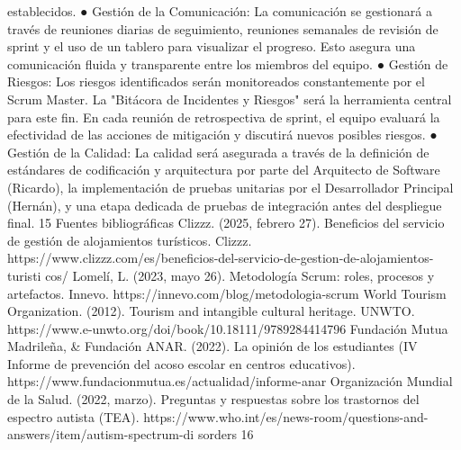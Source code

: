 establecidos.
● Gestión de la Comunicación: La comunicación se gestionará a través de
reuniones diarias de seguimiento, reuniones semanales de revisión de
sprint y el uso de un tablero para visualizar el progreso. Esto asegura una
comunicación fluida y transparente entre los miembros del equipo.
● Gestión de Riesgos: Los riesgos identificados serán monitoreados
constantemente por el Scrum Master. La "Bitácora de Incidentes y Riesgos"
será la herramienta central para este fin. En cada reunión de retrospectiva
de sprint, el equipo evaluará la efectividad de las acciones de mitigación y
discutirá nuevos posibles riesgos.
● Gestión de la Calidad: La calidad será asegurada a través de la definición
de estándares de codificación y arquitectura por parte del Arquitecto de
Software (Ricardo), la implementación de pruebas unitarias por el
Desarrollador Principal (Hernán), y una etapa dedicada de pruebas de
integración antes del despliegue final.
15
Fuentes bibliográficas
Clizzz. (2025, febrero 27). Beneficios del servicio de gestión de alojamientos
turísticos. Clizzz.
https://www.clizzz.com/es/beneficios-del-servicio-de-gestion-de-alojamientos-turisti
cos/
Lomelí, L. (2023, mayo 26). Metodología Scrum: roles, procesos y artefactos.
Innevo. https://innevo.com/blog/metodologia-scrum
World Tourism Organization. (2012). Tourism and intangible cultural heritage.
UNWTO. https://www.e-unwto.org/doi/book/10.18111/9789284414796
Fundación Mutua Madrileña, & Fundación ANAR. (2022). La opinión de los
estudiantes (IV Informe de prevención del acoso escolar en centros educativos).
https://www.fundacionmutua.es/actualidad/informe-anar
Organización Mundial de la Salud. (2022, marzo). Preguntas y respuestas sobre
los trastornos del espectro autista (TEA).
https://www.who.int/es/news-room/questions-and-answers/item/autism-spectrum-di
sorders
16